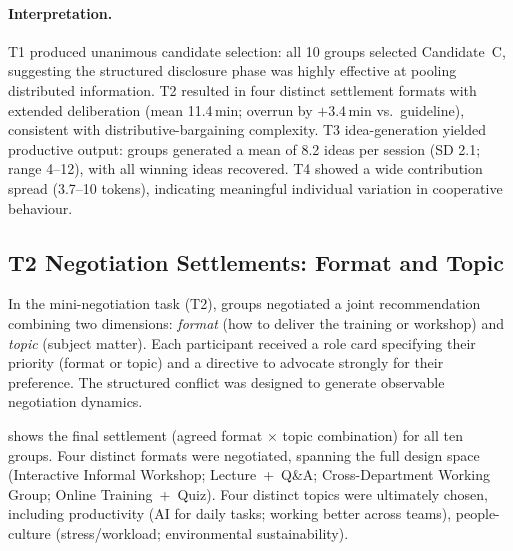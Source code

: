 \documentclass[11pt,a4paper]{article}
\begin{document}
\paragraph{Interpretation.}
T1 produced unanimous candidate selection: all 10 groups selected Candidate~C, 
suggesting the structured disclosure phase was highly effective at pooling distributed 
information. T2 resulted in four distinct settlement formats with extended deliberation 
(mean 11.4\,min; overrun by $+3.4$\,min vs.\ guideline), consistent with 
distributive-bargaining complexity.
T3 idea-generation yielded productive output: groups generated a mean of 8.2 
ideas per session (SD 2.1; range 4–12), with all winning ideas recovered.
T4 showed a wide contribution spread (3.7–10 tokens), indicating meaningful
individual variation in cooperative behaviour.

\subsection{T2 Negotiation Settlements: Format and Topic}
\label{subsec:t2-settlements}

In the mini-negotiation task (T2), groups negotiated a joint recommendation
combining two dimensions: \textit{format} (how to deliver the training or 
workshop) and \textit{topic} (subject matter). Each participant received a role 
card specifying their priority (format or topic) and a directive to advocate 
strongly for their preference. The structured conflict was designed to generate 
observable negotiation dynamics.

 shows the final settlement (agreed format $\times$ topic 
combination) for all ten groups. Four distinct formats were negotiated, spanning 
the full design space (Interactive Informal Workshop; Lecture~+~Q\&A; 
Cross-Department Working Group; Online Training~+~Quiz). Four distinct topics 
were ultimately chosen, including productivity (AI for daily tasks; working 
better across teams), people-culture (stress/workload; environmental 
sustainability).
\end{document}

